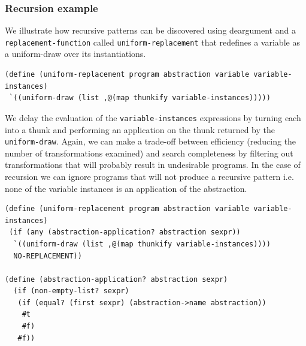 \documentclass[a4paper,10pt]{article}
\begin{document}
\subsubsection{Recursion example}
We illustrate how recursive patterns can be discovered using deargument and a \texttt{replacement-function} called \texttt{uniform-replacement} that redefines a variable as a uniform-draw over its instantiations.  
\begin{verbatim}
(define (uniform-replacement program abstraction variable variable-instances)
 `((uniform-draw (list ,@(map thunkify variable-instances)))))
\end{verbatim}

We delay the evaluation of the \texttt{variable-instances} expressions by turning each into a thunk and performing an application on the thunk returned by the \texttt{uniform-draw}.
Again, we can make a trade-off between efficiency (reducing the number of transformations examined) and search completeness by filtering out transformations that will probably result in undesirable programs.  In the case of recursion we can ignore programs that will not produce a recursive pattern i.e. none of the variable instances is an application of the abstraction.
\begin{verbatim}
(define (uniform-replacement program abstraction variable variable-instances)
 (if (any (abstraction-application? abstraction sexpr))
  `((uniform-draw (list ,@(map thunkify variable-instances))))
  NO-REPLACEMENT))

(define (abstraction-application? abstraction sexpr)
  (if (non-empty-list? sexpr)
   (if (equal? (first sexpr) (abstraction->name abstraction))
    #t
    #f)
   #f))
\end{verbatim}
\end{document}
